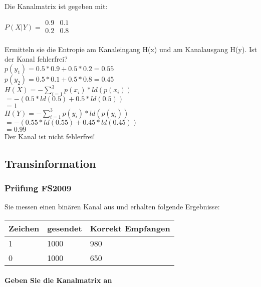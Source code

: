 Die Kanalmatrix ist gegeben mit:

$P(X|Y) = \begin{matrix}
    0.9 & 0.1\\
    0.2 & 0.8\\
\end{matrix}$

Ermitteln sie die Entropie am Kanaleingang H(x) und am Kanalausgang H(y). Ist der Kanal fehlerfrei?\\
$p(y_1)=0.5*0.9+0.5*0.2=0.55$\\
$p(y_2)=0.5*0.1+0.5*0.8=0.45$\\

$H(X)=-\sum_{i=1}^3p(x_i)*ld(p(x_i))$\\
$=-(0.5*ld(0.5)+0.5*ld(0.5))$\\
$=1$\\

$H(Y)=-\sum_{i=1}^3p(y_i)*ld(p(y_i))$\\
$=-(0.55*ld(0.55)+0.45*ld(0.45))$\\
$=0.99$\\

Der Kanal ist nicht fehlerfrei!

\columnbreak

\subsection{Transinformation}
\subsubsection{Prüfung FS2009}
Sie messen einen binären Kanal aus und erhalten folgende Ergebnisse:\\

\begin{center}
    \centering
    \begin{tabular}{l | l | l}
        \bfseries{Zeichen} & \bfseries{gesendet}& \bfseries{Korrekt Empfangen}\\ \hline
        1 & 1000 & 980\\ 
        0 & 1000 & 650
    \end{tabular}
\end{center}

\paragraph{Geben Sie die Kanalmatrix an}\mbox{}\\

